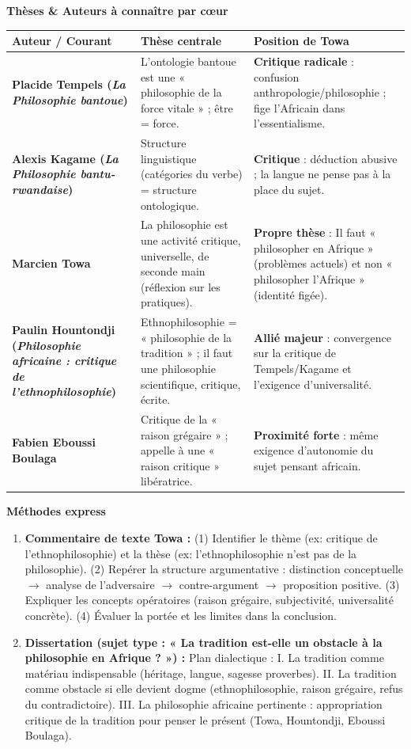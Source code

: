 \documentclass[11pt]{article}
\newcommand{\cle}[1]{{\popxbold\color{popdark}#1}}
\begin{document}
\begin{bilan}
\textbf{Thèses \& Auteurs à connaître par cœur}
\begin{center}
\begin{tabularx}{\linewidth}{|>{\bfseries}l|X|X|}\hline
\rowcolor{popblueL}
\textbf{Auteur / Courant} & \textbf{Thèse centrale} & \textbf{Position de Towa} \\\hline
\cle{Placide Tempels} (\emph{La Philosophie bantoue}) & L'ontologie bantoue est une « philosophie de la force vitale » ; être = force. & \textbf{Critique radicale} : confusion anthropologie/philosophie ; fige l'Africain dans l'essentialisme. \\\hline
\cle{Alexis Kagame} (\emph{La Philosophie bantu-rwandaise}) & Structure linguistique (catégories du verbe) = structure ontologique. & \textbf{Critique} : déduction abusive ; la langue ne pense pas à la place du sujet. \\\hline
\cle{Marcien Towa} & La philosophie est une activité \cle{critique}, \cle{universelle}, \cle{de seconde main} (réflexion sur les pratiques). & \textbf{Propre thèse} : Il faut « philosopher en Afrique » (problèmes actuels) et non « philosopher l'Afrique » (identité figée). \\\hline
\cle{Paulin Hountondji} (\emph{Philosophie africaine : critique de l'ethnophilosophie}) & Ethnophilosophie = « philosophie de la tradition » ; il faut une philosophie scientifique, critique, écrite. & \textbf{Allié majeur} : convergence sur la critique de Tempels/Kagame et l'exigence d'universalité. \\\hline
\cle{Fabien Eboussi Boulaga} & Critique de la « raison grégaire » ; appelle à une « raison critique » libératrice. & \textbf{Proximité forte} : même exigence d'autonomie du sujet pensant africain. \\\hline
\end{tabularx}
\end{center}

\textbf{Méthodes express}
\begin{enumerate}
    \item \textbf{Commentaire de texte Towa :} (1) Identifier le \cle{thème} (ex: critique de l'ethnophilosophie) et la \cle{thèse} (ex: l'ethnophilosophie n'est pas de la philosophie). (2) Repérer la \cle{structure argumentative} : distinction conceptuelle $\rightarrow$ analyse de l'adversaire $\rightarrow$ contre-argument $\rightarrow$ proposition positive. (3) Expliquer les \cle{concepts opératoires} (raison grégaire, subjectivité, universalité concrète). (4) \cle{Évaluer} la portée et les limites dans la conclusion.
    \item \textbf{Dissertation (sujet type : « La tradition est-elle un obstacle à la philosophie en Afrique ? ») :} Plan dialectique : I. La tradition comme \cle{matériau} indispensable (héritage, langue, sagesse proverbes). II. La tradition comme \cle{obstacle} si elle devient dogme (ethnophilosophie, raison grégaire, refus du contradictoire). III. La \cle{philosophie africaine pertinente} : appropriation critique de la tradition pour penser le présent (Towa, Hountondji, Eboussi Boulaga).
\end{enumerate}
\end{bilan}
\end{document}

